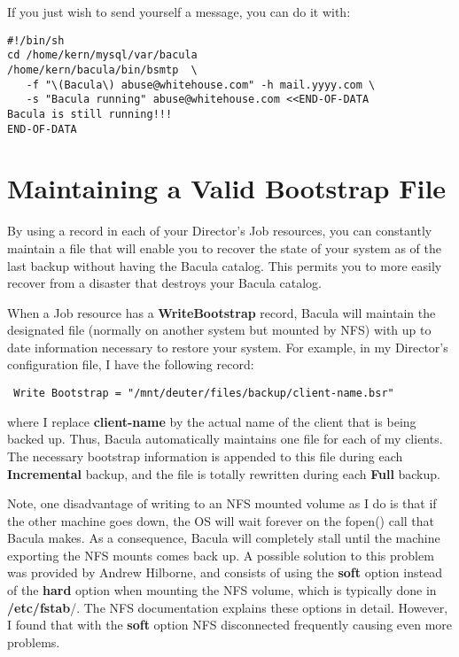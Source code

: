 If you just wish to send yourself a message, you can do it with: 

\footnotesize
\begin{verbatim}
#!/bin/sh
cd /home/kern/mysql/var/bacula
/home/kern/bacula/bin/bsmtp  \
   -f "\(Bacula\) abuse@whitehouse.com" -h mail.yyyy.com \
   -s "Bacula running" abuse@whitehouse.com <<END-OF-DATA
Bacula is still running!!!
END-OF-DATA
\end{verbatim}
\normalsize

\section{Maintaining a Valid Bootstrap File}
\label{bootstrap}

By using a 
 record in each of your
Director's Job resources, you can constantly maintain a 
\ilink{bootstrap}{BootstrapChapter} file that will enable you to
recover the state of your system as of the last backup without having the
Bacula catalog. This permits you to more easily recover from a disaster that
destroys your Bacula catalog. 

When a Job resource has a {\bf WriteBootstrap} record, Bacula will maintain
the designated file (normally on another system but mounted by NFS) with up to
date information necessary to restore your system. For example, in my
Director's configuration file, I have the following record: 

\footnotesize
\begin{verbatim}
 Write Bootstrap = "/mnt/deuter/files/backup/client-name.bsr"
\end{verbatim}
\normalsize

where I replace {\bf client-name} by the actual name of the client that is
being backed up. Thus, Bacula automatically maintains one file for each of my
clients. The necessary bootstrap information is appended to this file during
each {\bf Incremental} backup, and the file is totally rewritten during each
{\bf Full} backup. 

Note, one disadvantage of writing to an NFS mounted volume as I do is
that if the other machine goes down, the OS will wait forever on the fopen()
call that Bacula makes. As a consequence, Bacula will completely stall until
the machine exporting the NFS mounts comes back up. A possible solution to this
problem was provided by Andrew Hilborne, and consists of using the {\bf soft}
option instead of the {\bf hard} option when mounting the NFS volume, which is
typically done in {\bf /etc/fstab}/. The NFS documentation explains these
options in detail. However, I found that with the {\bf soft} option 
NFS disconnected frequently causing even more problems.


